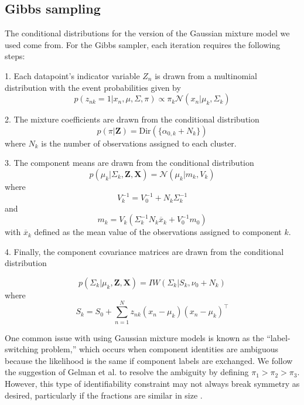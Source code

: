 \documentclass[twoside]{article}
\theoremstyle{theorem}
\theoremstyle{theorem}
\theoremstyle{theorem}
\theoremstyle{lemma}
\theoremstyle{definition}
\theoremstyle{example}
\begin{document}
\subsection{Gibbs sampling}
The conditional distributions for the version of the Gaussian mixture model we used come from\cite{Gelman, Jones}.
For the Gibbs sampler, each iteration requires the following steps: 

1. Each datapoint's indicator variable $Z_n$ is drawn from a multinomial distribution with the event probabilities given by 
\begin{equation}
p(z_{nk} = 1| x_n, \mu, \Sigma, \pi)  \propto \pi_k \mathcal{N}(x_n | \mu_k, \Sigma_k)\end{equation}

2. The mixture coefficients are drawn from the conditional distribution 
\begin{equation}
p(\pi|\mathbf{Z}) = \mathrm{Dir}(\{\alpha_{0,k}+ N_k\} )
\end{equation}
where $N_k$ is the number of observations assigned to each cluster. 

3. The component means are drawn from the conditional distribution 
\begin{equation}
p(\mu_k | \Sigma_k, \mathbf{Z}, \mathbf{X}) = \mathcal{N}(\mu_k | m_k, V_k)
\end{equation}
where 
\begin{equation}
V_k^{-1} = V_0^{-1} + N_k\Sigma_k^{-1}
\end{equation}
and 
\begin{equation}
 m_k = V_k(\Sigma_k^{-1}N_k\overline{x}_k + V_0^{-1}m_0)
 \end{equation}
 with $\overline{x}_k$  defined as the mean value of the observations assigned to component $k$. 
 
 4. Finally, the component covariance matrices are drawn from the conditional distribution 
 
 \begin{equation}
 p(\Sigma_k | \mu_k, \mathbf{Z}, \mathbf{X}) = IW(\Sigma_k | S_k, \nu_0+N_k)
 \end{equation}
 where 
 \begin{equation}
S_k = S_0 + \sum_{n=1}^N z_{nk}(x_n - \mu_k)(x_n - \mu_k)^\top
\end{equation}



One common issue with using Gaussian mixture models is known as the ``label-switching problem,'' which occurs when component identities are ambiguous because the likelihood is the same if component labels are exchanged. We follow the suggestion of Gelman et al. \cite{Gelman} to resolve the ambiguity by defining $\pi_1 > \pi_2 > \pi_3$. However, this type of identifiability constraint may not always break symmetry as desired, particularly if the fractions are similar in size \cite{Stephens}. 
\end{document}
